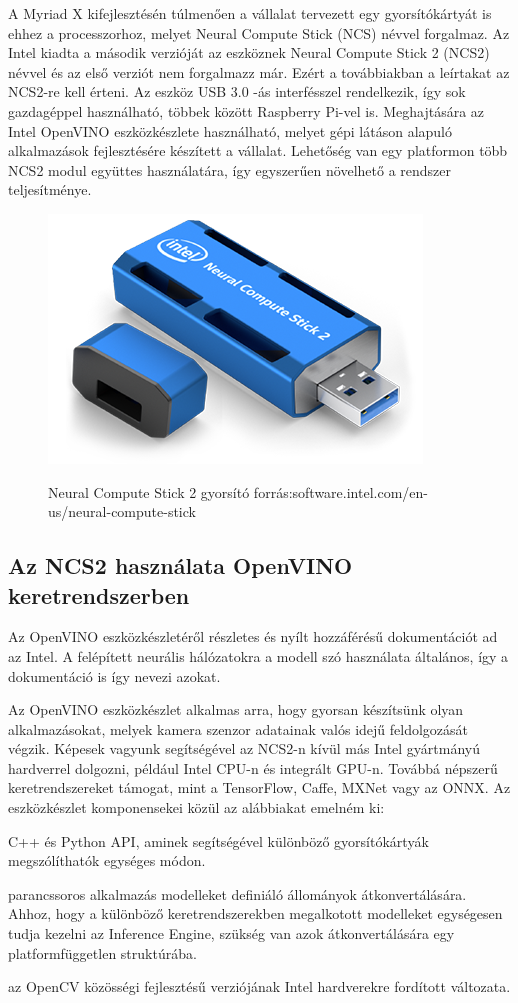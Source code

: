 A Myriad X kifejlesztésén túlmenően a vállalat tervezett egy gyorsítókártyát is ehhez a processzorhoz, melyet Neural Compute Stick (NCS) névvel forgalmaz. Az Intel kiadta a második verzióját az eszköznek  Neural Compute Stick 2 (NCS2) névvel és az első verziót nem forgalmazz már. Ezért a továbbiakban a leírtakat az NCS2-re kell érteni.
Az eszköz USB 3.0 -ás interfésszel rendelkezik, így sok gazdagéppel használható, többek között Raspberry Pi-vel is. Meghajtására az Intel OpenVINO eszközkészlete használható, melyet gépi látáson alapuló alkalmazások fejlesztésére készített a vállalat. Lehetőség van egy platformon több NCS2 modul együttes használatára, így egyszerűen növelhető a rendszer teljesítménye.
\begin{figure}[h]
	\centering
	\includegraphics[width=0.3\linewidth]{fig/NCS2-specs}\\
	\caption{Neural Compute Stick 2 gyorsító \footnotesize forrás:software.intel.com/en-us/neural-compute-stick} 
	\label{fig:ncs2-specs}
\end{figure}

\subsection{Az NCS2 használata OpenVINO keretrendszerben}
Az OpenVINO eszközkészletéről részletes és nyílt hozzáférésű dokumentációt ad az Intel. \cite{web:OpenVINO} A felépített neurális hálózatokra a modell szó használata általános, így a dokumentáció is így nevezi azokat.

Az OpenVINO eszközkészlet alkalmas arra, hogy gyorsan készítsünk olyan alkalmazásokat, melyek %
kamera szenzor adatainak valós idejű feldolgozását végzik. Képesek vagyunk segítségével az NCS2-n kívül más Intel gyártmányú hardverrel dolgozni, például Intel CPU-n és integrált GPU-n. Továbbá népszerű keretrendszereket támogat, mint a TensorFlow, Caffe, MXNet vagy az ONNX. Az eszközkészlet komponensekei közül az alábbiakat emelném ki:
\begin{description}[noitemsep]
	\item[Inference Engine] C++ és Python API, aminek segítségével különböző gyorsítókártyák megszólíthatók egységes módon.
	\item[Model Optimizer] parancssoros alkalmazás modelleket definiáló állományok átkonvertálására. Ahhoz, hogy a különböző keretrendszerekben megalkotott modelleket egységesen tudja kezelni az Inference Engine, szükség van azok átkonvertálására egy platformfüggetlen struktúrába.
	\item[OpenCV] az OpenCV közösségi fejlesztésű verziójának Intel hardverekre fordított változata.
\end{description}

